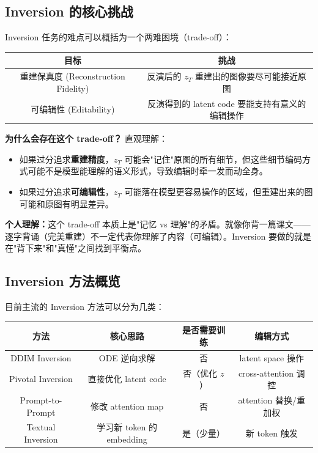 \documentclass[11pt,a4paper]{article}
\theoremstyle{definition}
\begin{document}
\subsection{Inversion 的核心挑战}

Inversion 任务的难点可以概括为一个两难困境（trade-off）：

\begin{center}
\begin{tabular}{c|c}
    \toprule
    \textbf{目标} & \textbf{挑战} \\
    \midrule
    重建保真度 (Reconstruction Fidelity) & 反演后的 $z_T$ 重建出的图像要尽可能接近原图 \\
    可编辑性 (Editability) & 反演得到的 latent code 要能支持有意义的编辑操作 \\
    \bottomrule
\end{tabular}
\end{center}

\textbf{为什么会存在这个 trade-off？} 直观理解：
\begin{itemize}
    \item 如果过分追求\textbf{重建精度}，$z_T$ 可能会"记住"原图的所有细节，但这些细节编码方式可能不是模型能理解的语义形式，导致编辑时牵一发而动全身。
    \item 如果过分追求\textbf{可编辑性}，$z_T$ 可能落在模型更容易操作的区域，但重建出来的图可能和原图有明显差异。
\end{itemize}

\textbf{个人理解：}这个 trade-off 本质上是"记忆 vs 理解"的矛盾。就像你背一篇课文——逐字背诵（完美重建）不一定代表你理解了内容（可编辑）。Inversion 要做的就是在"背下来"和"真懂"之间找到平衡点。

\subsection{Inversion 方法概览}

目前主流的 Inversion 方法可以分为几类：

\begin{center}
\begin{tabular}{c|c|c|c}
    \toprule
    \textbf{方法} & \textbf{核心思路} & \textbf{是否需要训练} & \textbf{编辑方式} \\
    \midrule
    DDIM Inversion & ODE 逆向求解 & 否 & latent space 操作 \\
    Pivotal Inversion & 直接优化 latent code & 否（优化 $z$） & cross-attention 调控 \\
    Prompt-to-Prompt & 修改 attention map & 否 & attention 替换/重加权 \\
    Textual Inversion & 学习新 token 的 embedding & 是（少量） & 新 token 触发 \\
    \bottomrule
\end{tabular}
\end{center}
\end{document}
